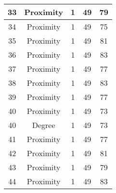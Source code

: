 \documentclass[results.tex]{subfiles}
\begin{document}
\begin{center}
\begin{tabular}{| c || c | c | c | c |}
            \hline
            33                      & Proximity                    & 1                      & 49                      & 79                   \\
            \hline
            34                      & Proximity                    & 1                      & 49                      & 75                   \\
            \hline
            35                      & Proximity                    & 1                      & 49                      & 81                   \\
            \hline
            36                      & Proximity                    & 1                      & 49                      & 83                   \\
            \hline
            37                      & Proximity                    & 1                      & 49                      & 77                   \\
            \hline
            38                      & Proximity                    & 1                      & 49                      & 83                   \\
            \hline
            39                      & Proximity                    & 1                      & 49                      & 77                   \\
            \hline
            40                      & Proximity                    & 1                      & 49                      & 73                   \\
            \hline
            40                      & Degree                       & 1                      & 49                      & 73                   \\
            \hline
            41                      & Proximity                    & 1                      & 49                      & 77                   \\
            \hline
            42                      & Proximity                    & 1                      & 49                      & 81                   \\
            \hline
            43                      & Proximity                    & 1                      & 49                      & 79                   \\
            \hline
            44                      & Proximity                    & 1                      & 49                      & 83                   \\

\end{tabular}
\end{center}
\end{document}
